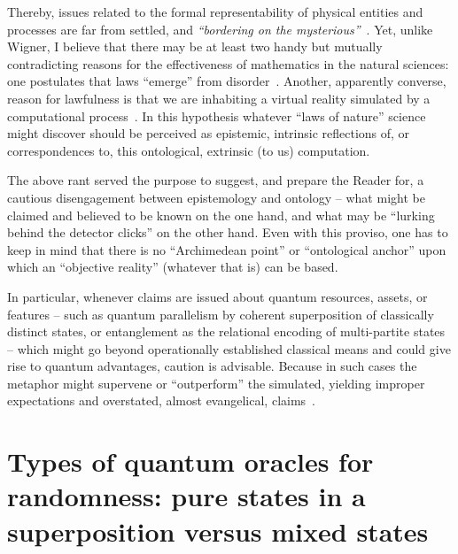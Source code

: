 \documentclass{ws-procs9x6}
\begin{document}
Thereby, issues related to the formal representability of physical entities and processes
are far from settled, and \emph{``bordering on the mysterious''}~\cite{wigner}.
Yet, unlike Wigner, I believe that there may be at least two handy but mutually contradicting
reasons for the effectiveness of mathematics in the natural sciences: one postulates
that laws ``emerge'' from disorder~\cite{Exner-1908,Yanofsky-chaos,svozil-2018-was}.
Another, apparently converse, reason for lawfulness is that we are inhabiting a virtual reality
simulated by a computational process~\cite{zuse-70,toffoli:79,simula,permutationcity,Bostrom-sim}.
In this hypothesis whatever
``laws of nature'' science might discover should be perceived as epistemic,
intrinsic reflections of, or correspondences to, this ontological, extrinsic (to us) computation.

The above rant served the purpose to suggest, and prepare the Reader for, a cautious disengagement between
epistemology and ontology -- what
might be claimed and believed to be known on the one hand,
and what may be ``lurking behind the detector clicks'' on the other hand.
Even with this proviso, one has to keep in mind that there is no ``Archimedean point''
or ``ontological anchor'' upon which an ``objective reality''
(whatever that is) can be based.

In particular, whenever claims are issued about quantum resources, assets, or features
-- such as quantum parallelism by coherent superposition of classically distinct states,
or entanglement as the relational encoding of multi-partite states --
which might go beyond operationally established classical means and could give rise to quantum advantages,
caution is advisable.
Because in such cases the metaphor might supervene or ``outperform'' the simulated,
yielding improper expectations and overstated, almost evangelical, claims~\cite{svozil-2016-quantum-hokus-pokus}.


\section{Types of quantum oracles for randomness: pure states in a superposition versus mixed states}

\label{2020-vectorc-irrev}
\end{document}
